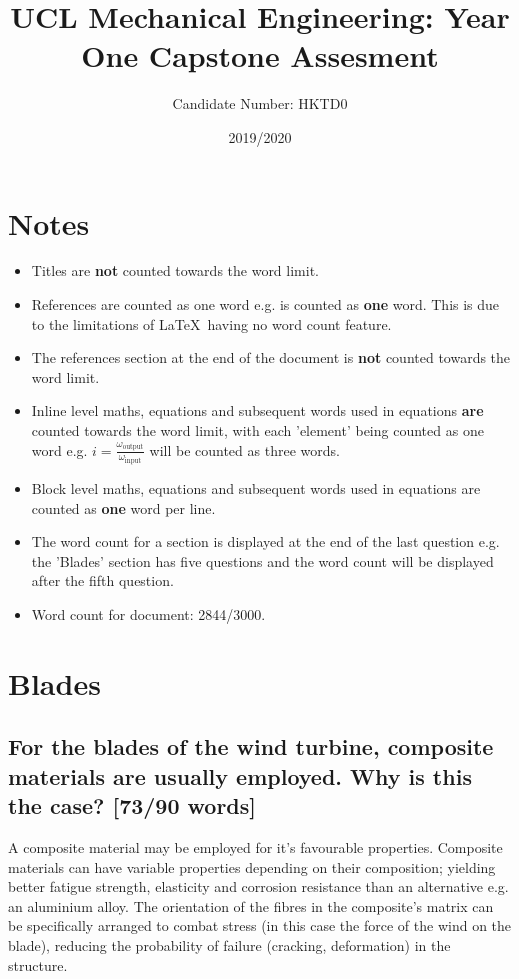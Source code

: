 \documentclass[12pt]{article}
\newcommand{\citeprimsec}[2]{\citep[][cited by \citealp{#2}]{#1}}
\numberwithin{equation}{section}
\begin{document}
\title{UCL Mechanical Engineering: Year One Capstone Assesment}
\date{2019/2020}
\author{Candidate Number: HKTD0}
\maketitle
\begin{flushleft}
\tableofcontents
\newpage

\section*{Notes}
\begin{itemize}
  \item Titles are \textbf{not} counted towards the word limit.
  \item References are counted as one word e.g. \citeprimsec{windTurbineMaterial2}{windTurbineMaterial} is counted as \textbf{one} word. This is due to the limitations of \LaTeX \ having no word count feature.
  \item The references section at the end of the document is \textbf{not} counted towards the word limit.
  \item Inline level maths, equations and subsequent words used in equations \textbf{are} counted towards the word limit, with each 'element' being counted as one word e.g. $i = \frac{\omega_{\textrm{output}}}{\omega_{\textrm{input}}}$ will be counted as three words.
  \item Block level maths, equations and subsequent words used in equations are counted as \textbf{one} word per line.
  \item The word count for a section is displayed at the end of the last question e.g. the 'Blades' section has five questions and the word count will be displayed after the fifth question.
  \item Word count for document: 2844/3000.
\end{itemize}
\newpage

\section{Blades}
\subsection[Why use composites?]{For the blades of the wind turbine, composite materials are usually employed. Why is this the case? [73/90 words]}
A composite material may be employed for it's favourable properties. Composite materials can have variable properties depending on their composition; yielding better fatigue strength, elasticity and corrosion resistance than an alternative e.g. an aluminium alloy. The orientation of the fibres in the composite's matrix can be specifically arranged to combat stress (in this case the force of the wind on the blade), reducing the probability of failure (cracking, deformation) in the structure.


\end{flushleft}
\end{document}

